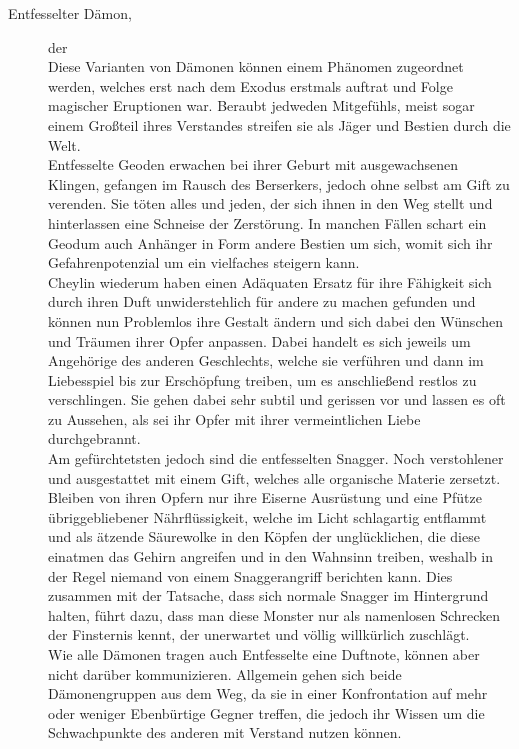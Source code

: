 \documentclass[a4paper,12pt,oneside]{book}
\begin{document}
\begin{description}
\item[Entfesselter Dämon,] der
\\Diese Varianten von Dämonen können einem Phänomen zugeordnet werden, welches erst nach dem Exodus erstmals auftrat und Folge magischer Eruptionen war. Beraubt jedweden Mitgefühls, meist sogar einem Großteil ihres Verstandes streifen sie als Jäger und Bestien durch die Welt.
\\ Entfesselte Geoden erwachen bei ihrer Geburt mit ausgewachsenen Klingen, gefangen im Rausch des Berserkers, jedoch ohne selbst am Gift zu verenden. Sie töten alles und jeden, der sich ihnen in den Weg stellt und hinterlassen eine Schneise der Zerstörung. In manchen Fällen schart ein Geodum auch Anhänger in Form andere Bestien um sich, womit sich ihr Gefahrenpotenzial um ein vielfaches steigern kann.
\\Cheylin wiederum haben einen Adäquaten Ersatz für ihre Fähigkeit sich durch ihren Duft unwiderstehlich für andere zu machen gefunden und können nun Problemlos ihre Gestalt ändern und sich dabei den Wünschen und Träumen ihrer Opfer anpassen. Dabei handelt es sich jeweils um Angehörige des anderen Geschlechts, welche sie verführen und dann im Liebesspiel bis zur Erschöpfung treiben, um es anschließend restlos zu verschlingen. Sie gehen dabei sehr subtil und gerissen vor und lassen es oft zu Aussehen, als sei ihr Opfer mit ihrer vermeintlichen Liebe durchgebrannt.
\\Am gefürchtetsten jedoch sind die entfesselten Snagger. Noch verstohlener und ausgestattet mit einem Gift, welches alle organische Materie zersetzt. Bleiben von ihren Opfern nur ihre Eiserne Ausrüstung und eine Pfütze übriggebliebener Nährflüssigkeit, welche im Licht schlagartig entflammt und als ätzende Säurewolke in den Köpfen der unglücklichen, die diese einatmen das Gehirn angreifen und in den Wahnsinn treiben, weshalb in der Regel niemand von einem Snaggerangriff berichten kann. Dies zusammen mit der Tatsache, dass sich normale Snagger im Hintergrund halten, führt dazu, dass man diese Monster nur als namenlosen Schrecken der Finsternis kennt, der unerwartet und völlig willkürlich zuschlägt.
\\Wie alle Dämonen tragen auch Entfesselte eine Duftnote, können aber nicht darüber kommunizieren. Allgemein gehen sich beide Dämonengruppen aus dem Weg, da sie in einer Konfrontation auf mehr oder weniger Ebenbürtige Gegner treffen, die jedoch ihr Wissen um die Schwachpunkte des anderen mit Verstand nutzen können.


\end{description}
\end{document}
